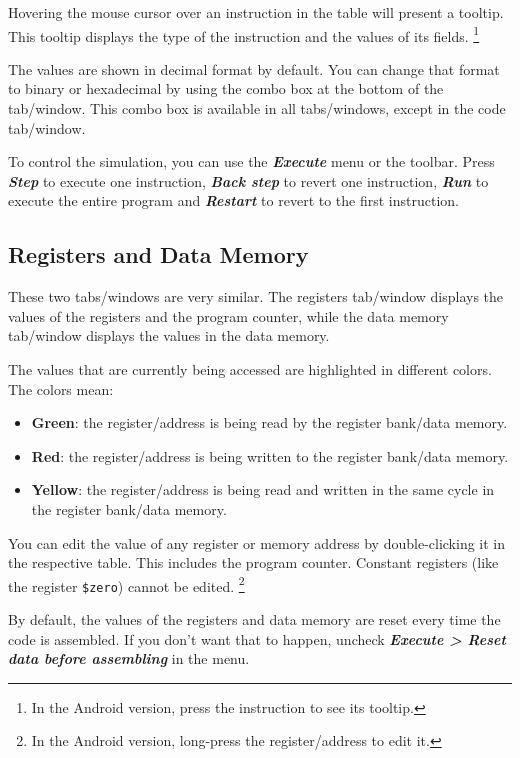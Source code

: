 \documentclass[11pt,a4paper,twoside,titlepage]{article}
\newcommand{\menupath}[1]{\textbf{\emph{#1}}}
\begin{document}
Hovering the mouse cursor over an instruction in the table will present a
tooltip. This tooltip displays the type of the instruction and the values
of its fields. \footnote{In the Android version, press the instruction to
see its tooltip.}

The values are shown in decimal format by default.
You can change that format to binary or hexadecimal by using the combo box
at the bottom of the tab/window.
This combo box is available in all tabs/windows, except in the code tab/window.

To control the simulation, you can use the \menupath{Execute} menu or the toolbar.
Press \menupath{Step} to execute one instruction, \menupath{Back step}
to revert one instruction, \menupath{Run} to execute the entire program and
\menupath{Restart} to revert to the first instruction.


\subsection{Registers and Data Memory}

These two tabs/windows are very similar.
The registers tab/window displays the values of the registers and the program
counter, while the data memory tab/window displays the values in the data
memory.

The values that are currently being accessed are highlighted in different 
colors. The colors mean:
\begin{itemize}
	\item \textbf{Green}: the register/address is being read by the register
		bank/data memory.
	\item \textbf{Red}: the register/address is being written to the register
		bank/data memory.
	\item \textbf{Yellow}: the register/address is being read and written in
		the same cycle in the register bank/data memory.
\end{itemize}

You can edit the value of any register or memory address by double-clicking
it in the respective table. This includes the program counter.
Constant registers (like the register \verb+$zero+) cannot be edited.
\footnote{In the Android version, long-press the register/address to edit it.}

By default, the values of the registers and data memory are reset every time
the code is assembled.
If you don't want that to happen, uncheck 
\menupath{Execute > Reset data before assembling} in the menu.
\end{document}
